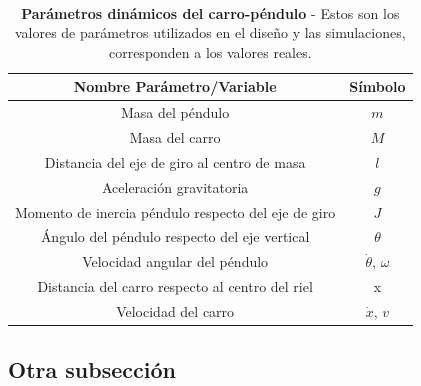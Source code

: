 \begin{table}[ht]                             %
\centering\                                     %
\begin{tabular}{||c | c ||}                     %
\hline                                          %
\hline
Nombre Parámetro/Variable & Símbolo\\
\hline
\hline
Masa del péndulo & $m$ \\
\hline
Masa del carro & $M$\\
\hline
Distancia del eje de giro al centro de masa & $l$ \\
\hline
Aceleración gravitatoria & $g$ \\
\hline
Momento de inercia péndulo respecto del eje de giro& $J$ \\
\hline
Ángulo del péndulo respecto del eje vertical & $\theta$\\
\hline
Velocidad angular del péndulo & $\dot{\theta}$, $\omega$\\
\hline
Distancia del carro respecto al centro del riel & x\\
\hline
Velocidad del carro & $\dot{x}$, $v$\\
\hline
\hline
\end{tabular}
\caption[Parámetros dinámicos del carro-péndulo]{\textbf{Parámetros dinámicos del carro-péndulo} - Estos son los valores de parámetros utilizados en el diseño y las simulaciones, corresponden a los valores reales.}
\label{tab:tabla}                              %
\end{table}

\blindtext



\subsection{Otra subsección}

\Blindtext